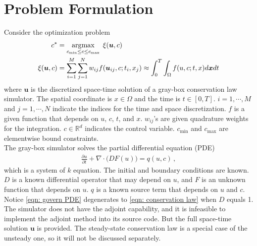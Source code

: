 \section{Problem Formulation}
\label{sec: formulation}
Consider the optimization problem
\begin{equation}\begin{split}
    c^* &= \argmax_{c_{\min}\le  c \le c_{\max}}\; \xi(\boldsymbol{u},c) \\
    \xi(\boldsymbol{u},c) &= \sum_{i=1}^M \sum_{j=1}^N w_{ij} f(\boldsymbol{u}_{ij},c; t_i,x_j)
    \approx \int_0^T \int_\Omega f(u,c; t,x)d\boldsymbol{x} d t%
    \label{eqn: objective prototype}
\end{split}\end{equation}
where $\boldsymbol{u}$ is the discretized space-time solution of a gray-box conservation law
simulator. The spatial coordinate is $x \in \Omega$ and the time is $t\in[0,T]$.
$i=1,\cdots, M$ and $j=1,\cdots, N$ indicate the indices for the time and space discretization.
$f$ is a given function that depends on $u$, $c$, $t$, and $x$.
$w_{ij}$'s are given quadrature weights for the integration.
$c\in\mathbb{R}^d$ indicates the control variable. 
$c_{\min}$ and $c_{\max}$ are elementwise bound constraints.\\

The gray-box simulator solves the partial differential equation (PDE)
\begin{equation}\begin{split}
    \frac{\partial u}{\partial t}+ \nabla \cdot \big( D F(u) \big) = q(u,c)\,,
\end{split}
\label{eqn: govern PDE}
\end{equation}
which is a system of $k$ equation. 
The initial and boundary conditions are known.
$D$ is a known differential operator that may depend on $u$, and
$F$ is an unknown function that depends on $u$.
$q$ is a known source term that depends on $u$ and $c$.
Notice \eqref{eqn: govern PDE} degenerates to \eqref{eqn: conservation law} when $D$ equals 1.
The simulator does not have the adjoint capability,
and it is infeasible to implement the adjoint method into its source code. But the full space-time solution 
$\boldsymbol{u}$ is provided. The steady-state conservation law is a special case
of the unsteady one, so it will not be discussed separately.\\

